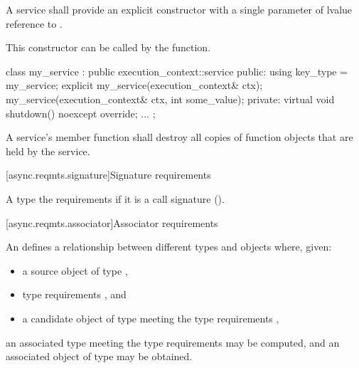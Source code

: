 \pnum
A service shall provide an explicit constructor with a single parameter of lvalue reference to . \begin{note} This constructor can be called by the  function. \end{note}

\pnum
\begin{example}

\begin{codeblock}
class my_service : public execution_context::service
{
public:
  using key_type = my_service;
  explicit my_service(execution_context& ctx);
  my_service(execution_context& ctx, int some_value);
private:
  virtual void shutdown() noexcept override;
  ...
};
\end{codeblock}

\end{example}

\pnum
A service's  member function shall destroy all copies of function objects that are held by the service.



[async.reqmts.signature]{Signature requirements}

%
%
\pnum
A type  the  requirements if it is a call signature ().



[async.reqmts.associator]{Associator requirements}

%
%
\pnum
An  defines a relationship between different types and objects where, given:

\begin{itemize}
\item
a source object  of type ,

\item
type requirements , and

\item
a candidate object  of type  meeting the type requirements ,
\end{itemize}

an associated type  meeting the type requirements  may be computed, and an associated object  of type  may be obtained.

